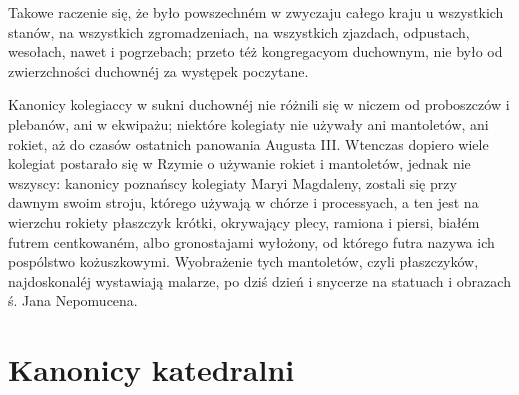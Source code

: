 \documentclass{book}
\begin{document}
Takowe raczenie się, że było powszechném w zwyczaju całego kraju u wszystkich stanów, na wszystkich zgromadzeniach, na wszystkich zjazdach, odpustach, wesołach, nawet i pogrzebach; przeto téż kongregacyom duchownym, nie było od zwierzchności duchownéj za występek poczytane.

Kanonicy kolegiaccy w sukni duchownéj nie różnili się w niczem od proboszczów i plebanów, ani w ekwipażu; niektóre kolegiaty nie używały ani mantoletów, ani rokiet, aż do czasów ostatnich panowania Augusta III. Wtenczas dopiero wiele kolegiat postarało się w Rzymie o używanie rokiet i mantoletów, jednak nie wszyscy: kanonicy poznańscy kolegiaty Maryi Magdaleny, zostali się przy dawnym swoim stroju, którego używają w chórze i processyach, a ten jest na wierzchu rokiety płaszczyk krótki, okrywający plecy, ramiona i piersi, białém futrem centkowaném, albo gronostajami wyłożony, od którego futra nazywa ich pospólstwo kożuszkowymi. Wyobrażenie tych mantoletów, czyli płaszczyków, najdoskonaléj wystawiają malarze, po dziś dzień i snycerze na statuach i obrazach ś. Jana Nepomucena.

\section{Kanonicy katedralni}
\end{document}
